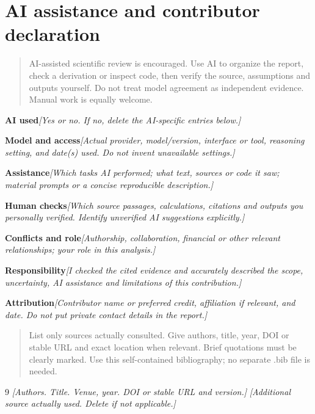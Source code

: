 \documentclass[11pt]{article}
\newcommand{\prompt}[1]{\textit{\textcolor{promptink}{[#1]}}}
\newcommand{\entry}[2]{\textbf{#1}\quad\prompt{#2}\par}
\newcommand{\guidance}[1]{\begin{quote}\small #1\end{quote}}
\begin{document}
\section{AI assistance and contributor declaration}
\guidance{AI-assisted scientific review is encouraged. Use AI to organize the report,
check a derivation or inspect code, then verify the source, assumptions and outputs
yourself. Do not treat model agreement as independent evidence. Manual work is
equally welcome.}
\entry{AI used}{Yes or no. If no, delete the AI-specific entries below.}
\entry{Model and access}{Actual provider, model/version, interface or tool,
reasoning setting, and date(s) used. Do not invent unavailable settings.}
\entry{Assistance}{Which tasks AI performed; what text, sources or code it saw;
material prompts or a concise reproducible description.}
\entry{Human checks}{Which source passages, calculations, citations and outputs
you personally verified. Identify unverified AI suggestions explicitly.}
\entry{Conflicts and role}{Authorship, collaboration, financial or other relevant
relationships; your role in this analysis.}
\entry{Responsibility}{I checked the cited evidence and accurately described the
scope, uncertainty, AI assistance and limitations of this contribution.}
\entry{Attribution}{Contributor name or preferred credit, affiliation if relevant,
and date. Do not put private contact details in the report.}

\guidance{List only sources actually consulted. Give authors, title, year, DOI or
stable URL and exact location when relevant. Brief quotations must be clearly
marked. Use this self-contained bibliography; no separate .bib file is needed.}
\begin{thebibliography}{9}
 \prompt{Authors. Title. Venue, year. DOI or stable URL and version.}
 \prompt{Additional source actually used. Delete if not applicable.}
\end{thebibliography}
\end{document}
